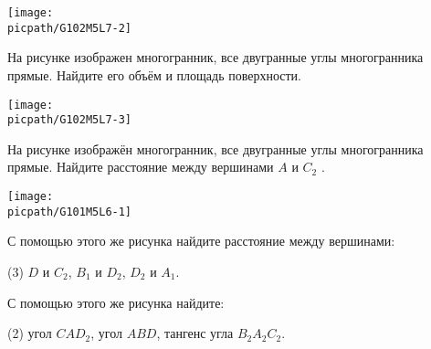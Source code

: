 \begin{class}[number=1]
\begin{listofex}
		\begin{minipage}[t]{\picwidth}
			\texttt{[image: \\picpath/G102M5L7-2]}
		\end{minipage}
		\item 
		\begin{minipage}[t]{\bodywidth}
			На рисунке изображен многогранник, все двугранные углы многогранника прямые. Найдите его объём и площадь поверхности.
		\end{minipage}
		\hspace{0.02\linewidth}
		\begin{minipage}[t]{\picwidth}
			\texttt{[image: \\picpath/G102M5L7-3]}
		\end{minipage}
		\item 
		\begin{minipage}[t]{\bodywidth}
			На рисунке изображён многогранник, все двугранные углы многогранника прямые. Найдите расстояние между вершинами \(A\) и \(C_2\) .
		\end{minipage}
		\hspace{0.02\linewidth}
		\begin{minipage}[t]{\picwidth}
			\texttt{[image: \\picpath/G101M5L6-1]}
		\end{minipage}
		\item С помощью этого же рисунка найдите расстояние между вершинами:
		\begin{tasks}(3)
			\task \(D\) и \(C_2\),
			\task \(B_1\) и \(D_2\),
			\task \(D_2\) и \(A_1\).
		\end{tasks}
		\item С помощью этого же рисунка найдите:
		\begin{tasks}(2)
			\task угол \( CAD_2 \),
			\task угол \( ABD \),
			\task тангенс угла \( B_2A_2C_2 \).
		\end{tasks}
		

\end{listofex}
\end{class}
